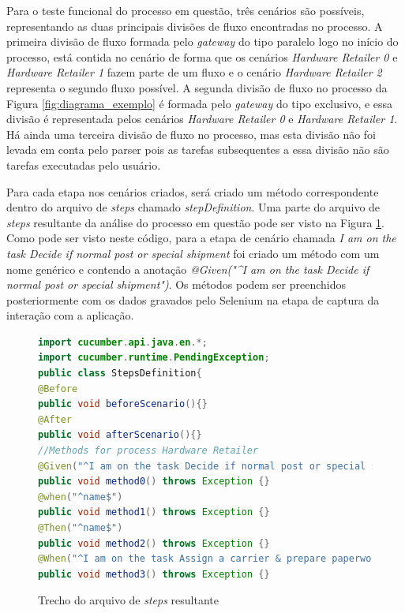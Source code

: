 \documentclass[12pt]{article}
\begin{document}
Para o teste funcional do processo em questão, três cenários são possíveis, representando as duas principais divisões de fluxo encontradas no processo. A primeira divisão de fluxo formada pelo \emph{gateway} do tipo paralelo logo no início do processo, está contida no cenário de forma que os cenários \emph{Hardware Retailer 0} e \emph{Hardware Retailer 1} fazem parte de um fluxo e o cenário \emph{Hardware Retailer 2} representa o segundo fluxo possível. A segunda divisão de fluxo no processo da Figura \ref{fig:diagrama_exemplo} é formada pelo \emph{gateway} do tipo exclusivo, e essa divisão é representada pelos cenários \emph{Hardware Retailer 0} e \emph{Hardware Retailer 1}. Há ainda uma terceira divisão de fluxo no processo, mas esta divisão não foi levada em conta pelo parser pois as tarefas subsequentes a essa divisão não são tarefas executadas pelo usuário.

Para cada etapa nos cenários criados, será criado um método correspondente dentro do arquivo de \emph{steps} chamado \emph{stepDefinition}. Uma parte do arquivo de \emph{steps} resultante da análise do processo em questão pode ser visto na Figura \ref{fig:codigojava}. Como pode ser visto neste código, para a etapa de cenário chamada \emph{I am on the task Decide if normal post or special shipment} foi criado um método com um nome genérico e contendo a anotação \emph{@Given("\^{}I am on the task Decide if normal post or special shipment\textdollar{}")}. Os métodos podem ser preenchidos posteriormente com os dados gravados pelo Selenium na etapa de captura da interação com a aplicação.

\begin{figure}[ht]
\centering
\begin{lstlisting}[language=Java,frame=single,basicstyle=\footnotesize\ttfamily]
import cucumber.api.java.en.*;
import cucumber.runtime.PendingException;
public class StepsDefinition{
@Before
public void beforeScenario(){}
@After
public void afterScenario(){} 
//Methods for process Hardware Retailer
@Given("^I am on the task Decide if normal post or special shipment$") 
public void method0() throws Exception {} 
@when("^name$") 
public void method1() throws Exception {} 
@Then("^name$") 
public void method2() throws Exception {} 
@When("^I am on the task Assign a carrier & prepare paperwork$") 
public void method3() throws Exception {} 
\end{lstlisting}
\caption{Trecho do arquivo de \emph{steps} resultante}
\label{fig:codigojava}
\end{figure}
\end{document}
